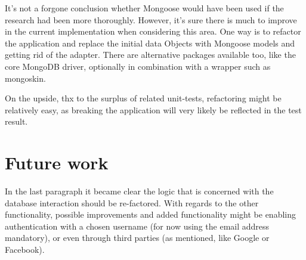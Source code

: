 It's not a forgone conclusion whether Mongoose would have been used if the
research had been more thoroughly. However, it's sure there is much to improve
in the current implementation when considering this area. One way is to refactor
the application and replace the initial data Objects with Mongoose models and
getting rid of the adapter. There are alternative packages available too, like 
the core MongoDB driver, optionally in combination with a wrapper such as 
mongoskin. 

On the upside, thx to the surplus of related unit-tests, refactoring might be 
relatively easy, as breaking the application will very likely be reflected in 
the test result.

\section{Future work}
In the last paragraph it became clear the logic that is concerned with the 
database interaction should be re-factored. With regards to the other 
functionality, possible improvements and added functionality might be enabling
authentication with a chosen username (for now using the email address 
mandatory), or even through third parties 
(as mentioned, like Google or Facebook).

